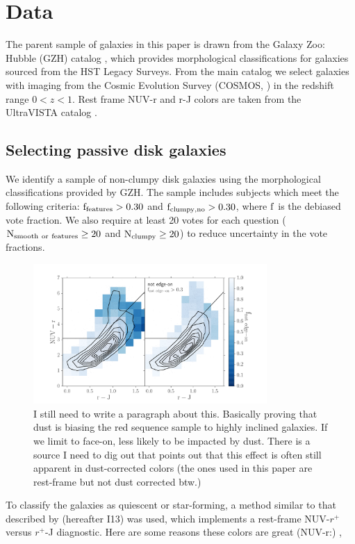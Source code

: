 \documentclass[useAMS,usenatbib]{mn2e}
\begin{document}
\section{Data}
\label{sec:Data}

The parent sample of galaxies in this paper is drawn from the Galaxy Zoo: Hubble (GZH) catalog \citep{Willett2016}, which provides morphological classifications for galaxies sourced from the HST Legacy Surveys. From the main catalog we select galaxies with imaging from the Cosmic Evolution Survey (COSMOS, \citet{Scoville2007}) in the redshift range $0<z<1$.  Rest frame NUV-r and r-J colors are taken from the UltraVISTA catalog \citep{McCracken2012,Ilbert2013}.

\subsection{Selecting passive disk galaxies}
\label{sec:sampleselection}
We identify a sample of non-clumpy disk galaxies using the morphological classifications provided by GZH. The sample includes subjects which meet the following criteria: $\rm f_{features} > 0.30$ and $\rm f_{clumpy,no} > 0.30$, where $\rm f$ is the debiased vote fraction. We also require at least 20 votes for each question ($\rm N_{smooth~or~features} \ge 20$ and $\rm N_{clumpy} \ge 20$) to reduce uncertainty in the vote fractions.
 
\begin{figure}
\centering
\includegraphics[width=3.5in,trim={1cm 0cm 0cm 0cm},clip]{figures/edgeon_colorcolor.pdf}
\caption{I still need to write a paragraph about this. Basically proving that dust is biasing the red sequence sample to highly inclined galaxies. If we limit to face-on, less likely to be impacted by dust. There is a source I need to dig out that points out that this effect is often still apparent in dust-corrected colors (the ones used in this paper are rest-frame but not dust corrected btw.)}
\label{fig:edgeon}
\end{figure}
To classify the galaxies as quiescent or star-forming, a method similar to that described by \citet{Ilbert2013} (hereafter I13) was used, which implements a rest-frame NUV-$r^{+}$ versus $r^{+}$-J diagnostic. Here are some reasons these colors are great (NUV-r:) \citep{Arnouts2007a,Salim2005a,Wyder2007},\citep{Martin2007}
\end{document}
